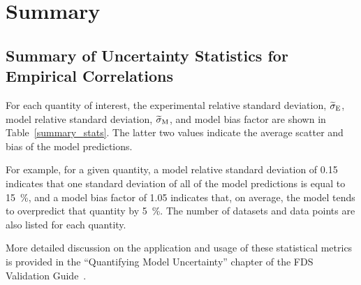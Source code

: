 
\chapter{Summary}
\label{Summary_Chapter}

\section*{Summary of Uncertainty Statistics for Empirical Correlations}

For each quantity of interest, the experimental relative standard deviation, $\widetilde{\sigma}\sb{E}$, model relative standard deviation, $\widetilde{\sigma}\sb{M}$, and model bias factor are shown in Table~\ref{summary_stats}. The latter two values indicate the average scatter and bias of the model predictions.

For example, for a given quantity, a model relative standard deviation of 0.15 indicates that one standard deviation of all of the model predictions is equal to 15~\%, and a model bias factor of 1.05 indicates that, on average, the model tends to overpredict that quantity by 5~\%. The number of datasets and data points are also listed for each quantity.

More detailed discussion on the application and usage of these statistical metrics is provided in the ``Quantifying Model Uncertainty'' chapter of the FDS Validation Guide~\cite{FDS_Validation_Guide}.

